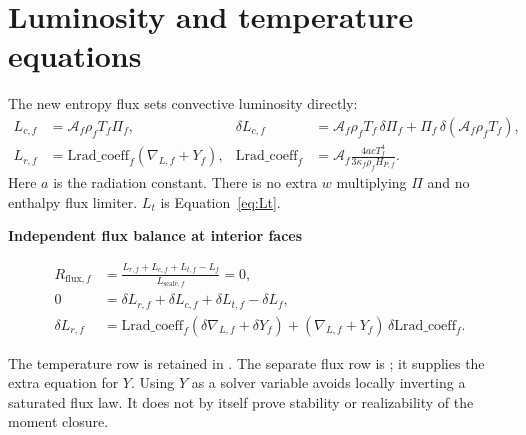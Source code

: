 \documentclass[11pt]{article}
\newcommand{\code}[1]{\texttt{\detokenize{#1}}}
\newcommand{\area}{\mathcal A}
\newenvironment{solved}[2]{%
 \begin{tcolorbox}[colback=#1!3!white,colframe=#1,boxrule=0.4pt,
 leftrule=2pt,arc=0pt,left=7pt,right=7pt,top=5pt,bottom=5pt,
 before skip=7pt,after skip=7pt]
 \noindent\textcolor{#1}{\textbf{#2}}\par
 \setlength{\abovedisplayskip}{5pt}\setlength{\belowdisplayskip}{5pt}
}{\end{tcolorbox}}
\numberwithin{equation}{section}
\begin{document}
\section{Luminosity and temperature equations}
The new entropy flux sets convective luminosity directly:
\begin{align}
 L_{c,f}&=\area_f\rho_fT_f\Pi_f,
 &\delta L_{c,f}
 &=\area_f\rho_fT_f\,\delta\Pi_f+
                  \Pi_f\,\delta(\area_f\rho_fT_f),\\
 L_{r,f}&=\mathrm{Lrad\_coeff}_f(\nabla_{L,f}+Y_f),
 &\mathrm{Lrad\_coeff}_f&=
 \area_f\frac{4acT_f^4}{3\kappa_f\rho_fH_{P,f}} .
\end{align}
Here $a$ is the radiation constant. There is no extra $w$ multiplying
$\Pi$ and no enthalpy flux limiter. $L_t$ is Equation~\eqref{eq:Lt}.
\begin{solved}{Algebraic}{Independent flux balance at interior faces}
\begin{align}
 R_{\mathrm{flux},f}&=
 \frac{L_{r,f}+L_{c,f}+L_{t,f}-L_f}{L_{\mathrm{scale},f}}=0,\\
 0&=\delta L_{r,f}+\delta L_{c,f}+\delta L_{t,f}-\delta L_f,\\
 \delta L_{r,f}&=\mathrm{Lrad\_coeff}_f(\delta\nabla_{L,f}+\delta Y_f)
             +(\nabla_{L,f}+Y_f)\,\delta\mathrm{Lrad\_coeff}_f .
\end{align}
\end{solved}
The temperature row is retained in \code{i_equL}. The separate flux
row is \code{i_rsp2_flux}; it supplies the extra equation for $Y$.
Using $Y$ as a solver variable avoids locally inverting a saturated flux law.
It does not by itself prove stability or realizability of the moment closure.
\end{document}
